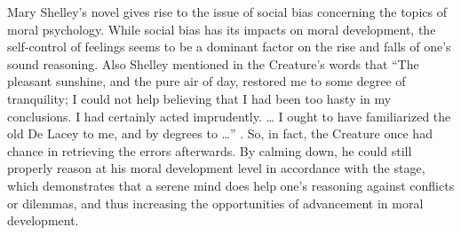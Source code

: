 \begin{text}
Mary Shelley's novel gives rise to the issue of social bias concerning the topics of  moral psychology. While social bias has its impacts on moral development, the self-control of feelings seems to be a dominant factor on the rise and falls of one's sound reasoning. Also Shelley mentioned in the Creature's words that ``The pleasant sunshine, and the pure air of day, restored me to some degree of tranquility; I could not help believing that I had been too hasty in my conclusions. I had certainly acted imprudently. \dots{} I ought to have familiarized the old De Lacey to me, and by degrees to \dots{}'' . So, in fact, the Creature once had chance in retrieving the errors afterwards. By calming down, he could still properly reason at his moral development level in accordance with the stage, which demonstrates that a serene mind does help one's reasoning against conflicts or dilemmas, and thus increasing the opportunities of advancement in moral development.










\end{text}
